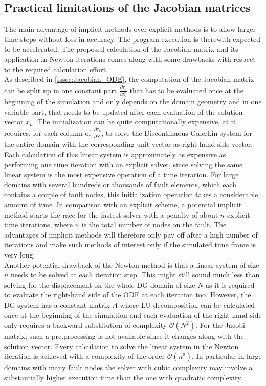 \subsection{Practical limitations of the Jacobian matrices}
The main advantage of implicit methods over explicit methods is to allow larger time steps without loss in accuracy. The program execution is therewith expected to be accelerated. The proposed calculation of the Jacobian matrix and its application in Newton iterations comes along with some drawbacks with respect to the required calculation effort. \\
As described in \autoref{sssec:Jacobian_ODE}, the computation of the Jacobian matrix can be split up in one constant part $\frac{\partial \tau_p}{\partial S_l}$ that has to be evaluated once at the beginning of the simulation and only depends on the domain geometry and in one variable part, that needs to be updated after each evaluation of the solution vector $x_n$. The initialization can be quite computationally expensive, at it requires, for each column of $\frac{\partial \tau_p}{\partial S_l}$, to solve the Discontinuous Galerkin system for the entire domain with the corresponding unit vector as right-hand side vector. Each calculation of this linear system is approximately as expensive as performing one time iteration with an explicit solver, since solving the same linear system is the most expensive operation of a time iteration. For large domains with several hundreds or thousands of fault elements, which each contains a couple of fault nodes, this initialization operation takes a considerable amount of time. In comparison with an explicit scheme, a potential implicit method starts the race for the fastest solver with a penalty of about $n$ explicit time iterations, where $n$ is the total number of nodes on the fault. The advantages of implicit methods will therefore only pay off after a high number of iterations and make such methods of interest only if the simulated time frame is very long. \\
Another potential drawback of the Newton method is that a linear system of size $n$ needs to be solved at each iteration step. This might still sound much less than solving for the displacement on the whole DG-domain of size $N$ as it is required to evaluate the right-hand side of the ODE at each iteration too. However, the DG system has a constant matrix $A$ whose LU-decomposition can be calculated once at the beginning of the simulation and each evaluation of the right-hand side only requires a backward substitution of complexity $\mathcal{O}\left(N^2\right)$. For the Jacobi matrix, such a pre.processing is not available since it changes along with the solution vector. Every calculation to solve the linear system in the Newton iteration is achieved with a complexity of the order $\mathcal{O}\left(n^3\right)$. In particular in large domains with many fault nodes the solver with cubic complexity may involve a substantially higher execution time than the one with quadratic complexity. 

